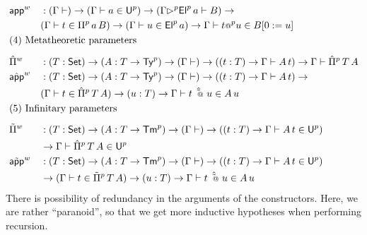 \begin{alignat*}{5}
  & \appw && :
    (\Gamma \vdash)\ra (\Gamma \vdash a \in \Uu)\ra(\Gamma \extu
    \Elu\,a \vdash B)\ra
    \\
    & &&
    (\Gamma \vdash t \in \Piu \, a \, B )
    \ra
    (\Gamma \vdash u \in \Elu\,a)
    \ra
    \Gamma \vdash t \appu u \in  B [0 := u] \\
  & \rlap{(4) Metatheoretic parameters} \\[0.5em]
  & \Pimw && :
    (T:\Set)\ra(A : T\ra \Tyu)\ra(\Gamma \vdash)\ra
    ((t : T)\ra\Gamma\vdash A\,t) \ra
    \Gamma \vdash \Pimu \,T\,A
    \\
    & \appmw  && :
    (T:\Set)\ra(A : T\ra \Tyu)\ra(\Gamma \vdash)\ra
    ((t : T)\ra\Gamma\vdash A\,t) \ra
    \\
    & &&
    (\Gamma \vdash t \in \Pimu \,T\,A)
    \ra (u : T) \ra \Gamma \vdash t\,\appmu\,u \in A\,u
    \\
  & \rlap{(5) Infinitary parameters} \\[0.5em]
  & \Piiw && :
    (T:\Set)\ra(A : T\ra \Tmu)\ra(\Gamma \vdash)\ra
    ((t : T)\ra\Gamma\vdash A\,t\in \Uu)
    \\ &&& \ra
    \Gamma \vdash \Pimu \,T\,A \in \Uu
  \\
  & \appiw && :
    (T:\Set)\ra(A : T\ra \Tmu)\ra(\Gamma \vdash)\ra
    ((t : T)\ra\Gamma\vdash A\,t\in\Uu)
    \\
    & &&
    \ra
    (\Gamma \vdash t \in \Piiu \,T\, A)
    \ra (u : T) \ra \Gamma \vdash t\,\appmu\,u \in A\,u
\end{alignat*}
There is possibility of redundancy in the arguments of
the constructors. Here, we are rather ``{paranoid}'', so that we get more inductive
hypotheses when performing recursion.


